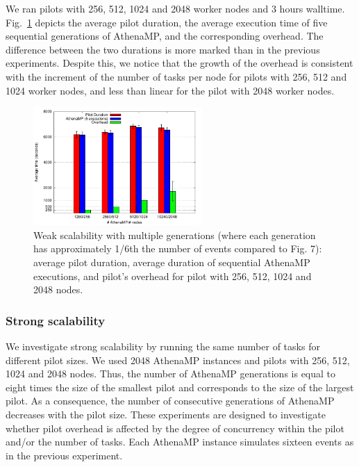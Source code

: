 We ran pilots with 256, 512, 1024 and 2048 worker nodes and 3
hours walltime. Fig.~\ref{fig:weakScal2a} depicts the average pilot duration,
the average execution time of five sequential generations of AthenaMP, and
the corresponding overhead. The difference between the two durations is more
marked than in the previous experiments. Despite this, we notice that the
growth of the overhead is consistent with the increment of the number of
tasks per node for pilots with 256, 512 and 1024 worker nodes, and less than
linear for the pilot with 2048 worker nodes.

\begin{figure}[!t]
    \includegraphics[height=4.5cm,width=\columnwidth]{./figures/NGE/weak2.pdf}
    \vspace{-0.3in}
    \caption{Weak scalability with multiple generations (where each
    generation has approximately 1/6th the number of events compared to Fig.
    7): average pilot duration, average duration of sequential AthenaMP
    executions, and pilot's overhead for pilot with 256, 512, 1024 and 2048
    nodes.}\label{fig:weakScal2a}
\end{figure}


\subsubsection{Strong scalability}

We investigate strong scalability by running the same number of tasks for
different pilot sizes. We used 2048 AthenaMP instances and pilots with 256,
512, 1024 and 2048 nodes. Thus, the number of AthenaMP generations is equal
to eight times the size of the smallest pilot and corresponds to the size of
the largest pilot. As a consequence, the number of consecutive generations of
AthenaMP decreases with the pilot size. These experiments are designed to
investigate whether pilot overhead is affected by the degree of concurrency
within the pilot and/or the number of tasks. Each AthenaMP instance simulates
sixteen events as in the previous experiment.

